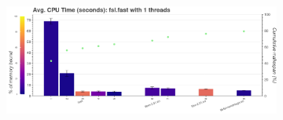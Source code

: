 \documentclass[conference]{IEEEtran}
\begin{document}
\begin{figure}[ht!]
	\centering
																																																																																																															
																																																																																																															
																																																																																																															
	\hfill
	\begin{subfigure}[t]{0.49\textwidth}
		\caption{}
		\label{subfig:hotspots-fsl-fast}
		\includegraphics[width=\textwidth]{figures/hotspots-1thread-fsl-fast.png}
	\end{subfigure}


\end{figure}
\end{document}
